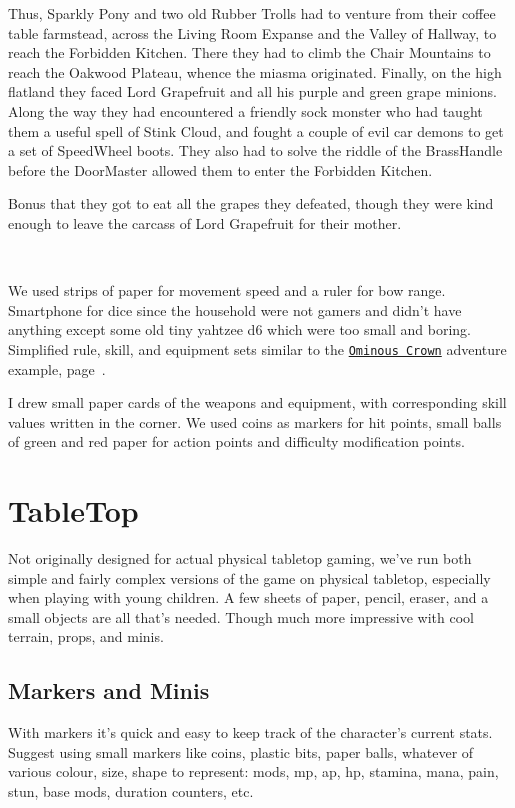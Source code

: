 Thus, Sparkly Pony and two old Rubber Trolls had to venture from their coffee table farmstead, across the Living Room Expanse and the Valley of Hallway, to reach the Forbidden Kitchen. There they had to climb the Chair Mountains to reach the Oakwood Plateau, whence the miasma originated. Finally, on the high flatland they faced Lord Grapefruit and all his purple and green grape minions. Along the way they had encountered a friendly sock monster who had taught them a useful spell of Stink Cloud, and fought a couple of evil car demons to get a set of SpeedWheel boots. They also had to solve the riddle of the BrassHandle before the DoorMaster allowed them to enter the Forbidden Kitchen.

Bonus that they got to eat all the grapes they defeated, though they were kind enough to leave the carcass of Lord Grapefruit for their mother.

\

We used strips of paper for movement speed and a ruler for bow range. Smartphone for dice since the household were not gamers and didn't have anything except some old tiny yahtzee d6 which were too small and boring.
Simplified rule, skill, and equipment sets similar to the \hyperref[sec:basicenough]{\texttt{Ominous Crown}} adventure example, page~\pageref{sec:basicenough}.

I drew small paper cards of the weapons and equipment, with corresponding skill values written in the corner. We used coins as markers for hit points, small balls of green and red paper for action points and difficulty modification points.









\section*{TableTop}
Not originally designed for actual physical tabletop gaming, we've run both simple and fairly complex versions of the game on physical tabletop, especially when playing with young children.
A few sheets of paper, pencil, eraser, and a small objects are all that's needed. Though much more impressive with cool terrain, props, and minis.


\subsection*{Markers and Minis}
With markers it's quick and easy to keep track of the character's current stats. Suggest using small markers like coins, plastic bits, paper balls, whatever of various colour, size, shape to represent: mods, mp, ap, hp, stamina, mana, pain, stun, base mods, duration counters, etc.

